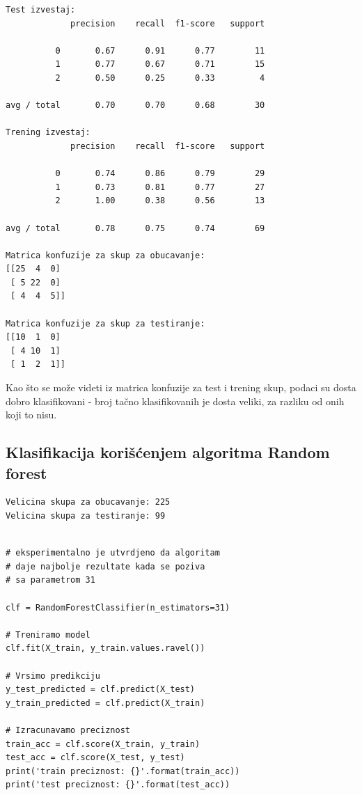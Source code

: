 \documentclass[12pt,a4paper]{article}
\begin{document}
\begin{verbatim}
Test izvestaj:
             precision    recall  f1-score   support

          0       0.67      0.91      0.77        11
          1       0.77      0.67      0.71        15
          2       0.50      0.25      0.33         4

avg / total       0.70      0.70      0.68        30

Trening izvestaj:
             precision    recall  f1-score   support

          0       0.74      0.86      0.79        29
          1       0.73      0.81      0.77        27
          2       1.00      0.38      0.56        13

avg / total       0.78      0.75      0.74        69

Matrica konfuzije za skup za obucavanje:
[[25  4  0]
 [ 5 22  0]
 [ 4  4  5]]

Matrica konfuzije za skup za testiranje:
[[10  1  0]
 [ 4 10  1]
 [ 1  2  1]]
\end{verbatim}

Kao \v sto se mo\v ze videti iz matrica konfuzije za test i trening skup, podaci su dosta dobro klasifikovani - broj ta\v cno klasifikovanih je dosta veliki, za razliku od onih koji to nisu.

\subsection{Klasifikacija kori\v s\' cenjem algoritma Random forest}

\begin{verbatim}
Velicina skupa za obucavanje: 225
Velicina skupa za testiranje: 99
\end{verbatim}

\begin{lstlisting}

# eksperimentalno je utvrdjeno da algoritam
# daje najbolje rezultate kada se poziva
# sa parametrom 31

clf = RandomForestClassifier(n_estimators=31)

# Treniramo model
clf.fit(X_train, y_train.values.ravel())

# Vrsimo predikciju
y_test_predicted = clf.predict(X_test)
y_train_predicted = clf.predict(X_train)

# Izracunavamo preciznost
train_acc = clf.score(X_train, y_train)
test_acc = clf.score(X_test, y_test)
print('train preciznost: {}'.format(train_acc))
print('test preciznost: {}'.format(test_acc))
\end{lstlisting}
\end{document}
